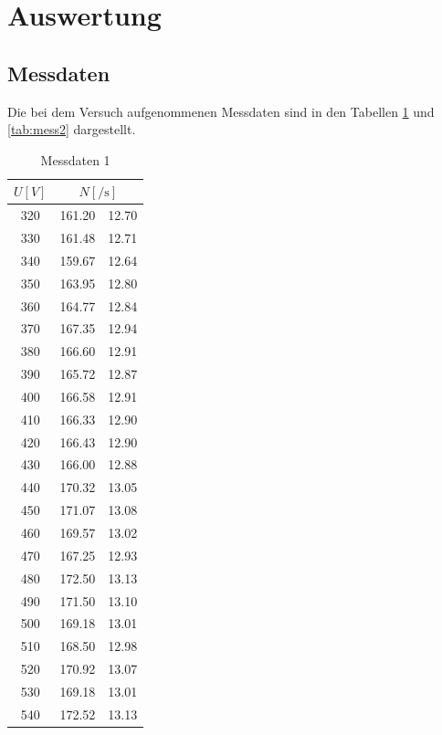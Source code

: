 \section{Auswertung}
\label{sec:Auswertung}
\subsection{Messdaten}
Die bei dem Versuch aufgenommenen Messdaten sind in den Tabellen \ref{tab:mess1} und \ref{tab:mess2}
dargestellt.
\begin{table}[H]
    \centering
        \caption{Messdaten 1}
        \label{tab:mess1}
        \begin{tabular}{c c @{${}\pm{}$} c}
          \toprule
          {$U [\si{V}]$} & \multicolumn{2}{c}{$N [\si{\per\second}]$} \\
          \midrule
          320 &  161.20 &  12.70\\
          330 &  161.48 &  12.71\\
          340 &  159.67 &  12.64\\
          350 &  163.95 &  12.80\\
          360 &  164.77 &  12.84\\
          370 &  167.35 &  12.94\\
          380 &  166.60 &  12.91\\
          390 &  165.72 &  12.87\\
          400 &  166.58 &  12.91\\
          410 &  166.33 &  12.90\\
          420 &  166.43 &  12.90\\
          430 &  166.00 &  12.88\\
          440 &  170.32 &  13.05\\
          450 &  171.07 &  13.08\\
          460 &  169.57 &  13.02\\
          470 &  167.25 &  12.93\\
          480 &  172.50 &  13.13\\
          490 &  171.50 &  13.10\\
          500 &  169.18 &  13.01\\
          510 &  168.50 &  12.98\\
          520 &  170.92 &  13.07\\
          530 &  169.18 &  13.01\\
          540 &  172.52 &  13.13\\

\end{tabular}
\end{table}
